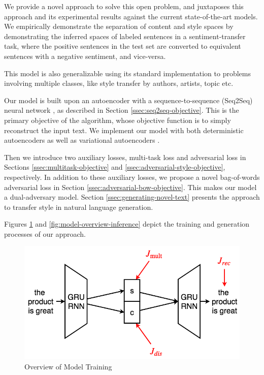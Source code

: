 We provide a novel approach to solve this open problem, and juxtaposes this approach and its experimental results against the current state-of-the-art models. We empirically demonstrate the separation of content and style spaces by demonstrating the inferred spaces of labeled sentences in a sentiment-transfer task, where the positive sentences in the test set are converted to equivalent sentences with a negative sentiment, and vice-versa.

This model is also generalizable using its standard implementation to problems involving multiple classes, like style transfer by authors, artists, topic etc.

Our model is built upon an autoencoder with a sequence-to-sequence (Seq2Seq) neural network \citep{sutskever2014sequence}, as described in Section \ref{ssec:seq2seq-objective}. This is the primary objective of the algorithm, whose objective function is to simply reconstruct the input text. We implement our model with both deterministic autoencoders \citep{baldi2012autoencoders} as well as variational autoencoders \citep{kingma2013auto}.

Then we introduce two auxiliary losses, multi-task loss and adversarial loss in Sections \ref{ssec:multitask-objective} and \ref{ssec:adversarial-style-objective}, respectively. In addition to these auxiliary losses, we propose a novel bag-of-words adversarial loss in Section \ref{ssec:adversarial-bow-objective}. This makes our model a dual-adversary model. Section \ref{ssec:generating-novel-text} presents the approach to transfer style in natural language generation.

Figures \ref{fig:model-overview-training} and \ref{fig:model-overview-inference} depict the training and generation processes of our approach.

\begin{figure}[ht]
	\centering
	\includegraphics[width=\linewidth]{images/model-overview-training.png}
	\caption{Overview of Model Training}
	\label{fig:model-overview-training}
\end{figure}

